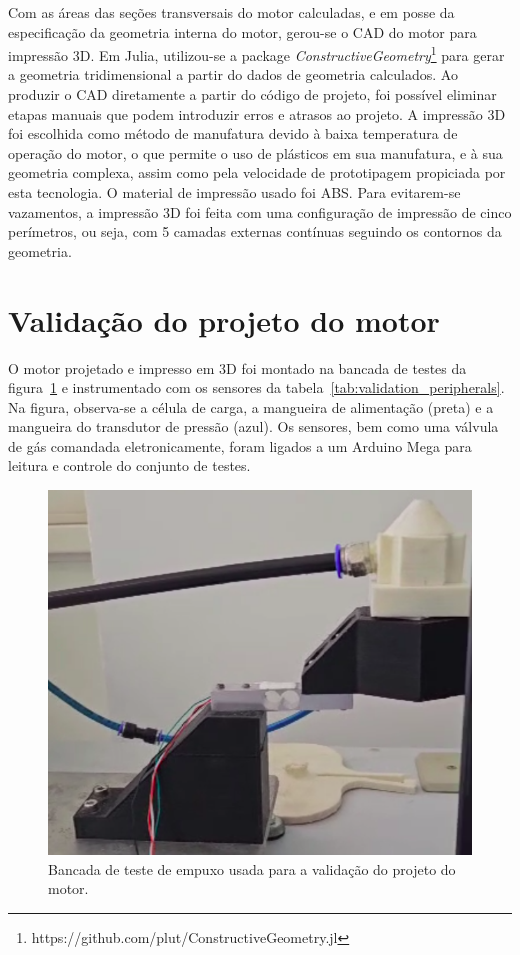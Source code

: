 Com as áreas das seções transversais do motor calculadas, e em posse da especificação da geometria interna do motor, gerou-se o CAD do motor para impressão 3D. Em Julia, utilizou-se a package \textit{ConstructiveGeometry}\footnote[1]{https://github.com/plut/ConstructiveGeometry.jl} para gerar a geometria tridimensional a partir do dados de geometria calculados. Ao produzir o CAD diretamente a partir do código de projeto, foi possível eliminar etapas manuais que podem introduzir erros e atrasos ao projeto. A impressão 3D foi escolhida como método de manufatura devido à baixa temperatura de operação do motor, o que permite o uso de plásticos em sua manufatura, e à sua geometria complexa, assim como pela velocidade de prototipagem propiciada por esta tecnologia. O material de impressão usado foi ABS\@. Para evitarem-se vazamentos, a impressão 3D foi feita com uma configuração de impressão de cinco perímetros, ou seja, com 5 camadas externas contínuas seguindo os contornos da geometria.

\section{Validação do projeto do motor}\label{sec:method_validation}

O motor projetado e impresso em 3D foi montado na bancada de testes da figura~\ref{fig:thrust_stand} e instrumentado com os sensores da tabela~\ref{tab:validation_peripherals}. Na figura, observa-se a célula de carga, a mangueira de alimentação (preta) e a mangueira do transdutor de pressão (azul). Os sensores, bem como uma válvula de gás comandada eletronicamente, foram ligados a um Arduino Mega para leitura e controle do conjunto de testes. 

\begin{figure}[htbp]
    \centering
    \includegraphics[height=.5\textheight]{img/thrust_stand.png}
    \caption{Bancada de teste de empuxo usada para a validação do projeto do motor.}\label{fig:thrust_stand}
\end{figure}

